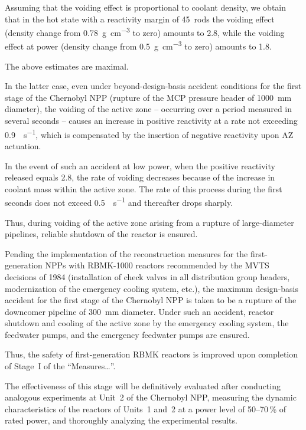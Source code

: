 \documentclass[openright]{bookest}
\begin{document}
Assuming that the voiding effect is proportional to coolant density, we obtain that in the hot state with a reactivity margin of 45~rods the voiding effect (density change from \qty{0.78}{\gram\per\centi\metre\cubed} to zero) amounts to \qty{2.8}{\betaeff}, while the voiding effect at power (density change from \qty{0.5}{\gram\per\centi\metre\cubed} to zero) amounts to \qty{1.8}{\betaeff}.

The above estimates are maximal.

In the latter case, even under beyond-design-basis accident conditions for the first stage of the Chernobyl NPP (rupture of the MCP pressure header of \qty{1000}{\milli\metre} diameter), the voiding of the active zone -- occurring over a period measured in several seconds -- causes an increase in positive reactivity at a rate not exceeding \qty{0.9}{\betaeff\per\second}, which is compensated by the insertion of negative reactivity upon AZ actuation.

In the event of such an accident at low power, when the positive reactivity released equals \qty{2.8}{\betaeff}, the rate of voiding decreases because of the increase in coolant mass within the active zone. The rate of this process during the first seconds does not exceed \qty{0.5}{\betaeff\per\second} and thereafter drops sharply.

Thus, during voiding of the active zone arising from a rupture of large-diameter pipelines, reliable shutdown of the reactor is ensured.

Pending the implementation of the reconstruction measures for the first-generation NPPs with RBMK-1000 reactors recommended by the MVTS decisions of 1984 (installation of check valves in all distribution group headers, modernization of the emergency cooling system, etc.), the maximum design-basis accident for the first stage of the Chernobyl NPP is taken to be a rupture of the downcomer pipeline of \qty{300}{\milli\metre} diameter. Under such an accident, reactor shutdown and cooling of the active zone by the emergency cooling system, the feedwater pumps, and the emergency feedwater pumps are ensured.

Thus, the safety of first-generation RBMK reactors is improved upon completion of Stage~I of the ``Measures\ldots''.

The effectiveness of this stage will be definitively evaluated after conducting analogous experiments at Unit~2 of the Chernobyl NPP, measuring the dynamic characteristics of the reactors of Units~1 and~2 at a power level of 50--70\,\% of rated power, and thoroughly analyzing the experimental results.
\end{document}
